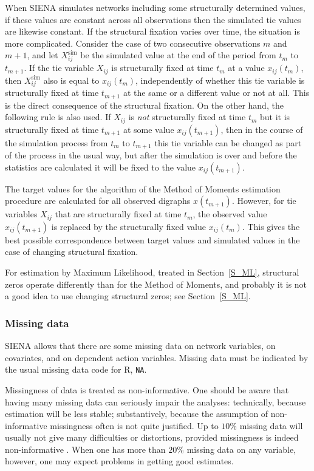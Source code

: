\documentclass[a4paper,fleqn,11pt]{article}
\newcommand{\+}{\, + \,}
\newcommand{\Rn}{{\sf R}}
\newcommand{\SI}{{\sf SIENA }}
\begin{document}
When \SI simulates networks including some structurally determined values,
if these values are constant across all observations then
the simulated tie values are likewise constant.
If the structural fixation varies over time, the situation
is more complicated.
Consider the case of two consecutive observations
$m$ and $m+1$,
and let $X^{\text{sim}}_{ij}$ be the simulated value
at the end of the period from $t_m$ to $t_{m+1}$.
If the tie variable $X_{ij}$ is structurally fixed at time $t_m$
at a value $x_{ij}(t_m)$,
then $X^{\text{sim}}_{ij}$ also is equal to $x_{ij}(t_m)$,
independently of whether this tie variable is structurally fixed
at time $t_{m+1}$ at the same or a different value or not at all.
This is the direct consequence of the structural fixation.
On the other hand, the following rule is also used.
If $X_{ij}$ is \emph{not} structurally fixed at time $t_m$
but it is structurally fixed at time $t_{m+1}$ at some value $x_{ij}(t_{m+1})$,
then in the course of the simulation process from  $t_m$ to $t_{m+1}$
this tie variable can be changed as part of the process in the usual way,
but after the simulation is over and before the statistics are calculated it will be fixed
to the value $x_{ij}(t_{m+1})$.

The target values for the algorithm of the Method of Moments estimation
procedure are calculated for all observed digraphs $x(t_{m+1})$.
However, for tie variables $X_{ij}$ that are
structurally fixed at time $t_m$, the observed value  $x_{ij}(t_{m+1})$
is replaced by the structurally fixed value  $x_{ij}(t_{m})$.
This gives the best possible correspondence between target values
and simulated values in the case of changing structural fixation.

For estimation by Maximum Likelihood, treated in Section~\ref{S_ML},
structural zeros operate differently than for the Method of Moments,
and probably it is not a good idea to use changing
structural zeros; see Section~\ref{S_ML}.


\subsubsection{Missing data}
\label{S_missing}

\SI allows that there are some missing data on network variables,
on covariates, and on dependent action
variables.  Missing data must be indicated by
the usual missing data code for \Rn, \texttt{NA}.

Missingness of data is treated as non-informative.
One should be aware that having many missing data can seriously
impair the analyses: technically, because estimation will be
less stable; substantively, because the assumption of
non-informative missingness often is not quite justified.
Up to $10\%$ missing data will usually not give many difficulties
or distortions, provided missingness is indeed non-informative
\citep{HuismanSteglich08}.
When one has more than $20\%$ missing data on any variable, however,
one may expect problems in getting good estimates.
\end{document}

